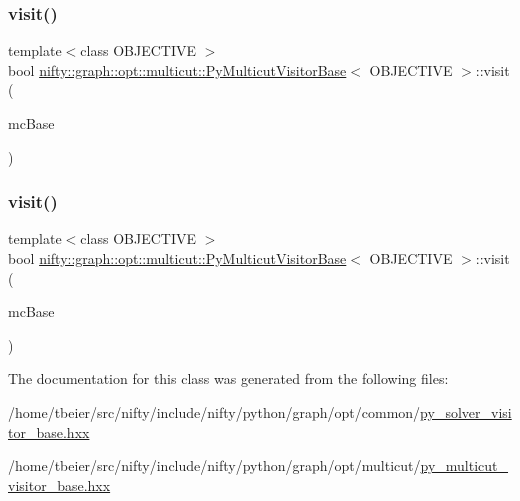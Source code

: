\subsubsection{\texorpdfstring{visit()}{visit()}\hspace{0.1cm}{\footnotesize\ttfamily [1/2]}}
{\footnotesize\ttfamily template$<$class O\+B\+J\+E\+C\+T\+I\+VE $>$ \\
bool \hyperlink{classnifty_1_1graph_1_1opt_1_1multicut_1_1PyMulticutVisitorBase}{nifty\+::graph\+::opt\+::multicut\+::\+Py\+Multicut\+Visitor\+Base}$<$ O\+B\+J\+E\+C\+T\+I\+VE $>$\+::visit (\begin{DoxyParamCaption}\item[{\hyperlink{classnifty_1_1graph_1_1opt_1_1multicut_1_1PyMulticutVisitorBase_aa6d9f36fb629bf51dadbc1018595cb14}{Mc\+Base} $\ast$}]{mc\+Base }\end{DoxyParamCaption})\hspace{0.3cm}{\ttfamily [inline]}}

\mbox{\label{classnifty_1_1graph_1_1opt_1_1multicut_1_1PyMulticutVisitorBase_a8cf6b53826b99b40dd5bf2734e04ea57}} 
\subsubsection{\texorpdfstring{visit()}{visit()}\hspace{0.1cm}{\footnotesize\ttfamily [2/2]}}
{\footnotesize\ttfamily template$<$class O\+B\+J\+E\+C\+T\+I\+VE $>$ \\
bool \hyperlink{classnifty_1_1graph_1_1opt_1_1multicut_1_1PyMulticutVisitorBase}{nifty\+::graph\+::opt\+::multicut\+::\+Py\+Multicut\+Visitor\+Base}$<$ O\+B\+J\+E\+C\+T\+I\+VE $>$\+::visit (\begin{DoxyParamCaption}\item[{\hyperlink{classnifty_1_1graph_1_1opt_1_1multicut_1_1PyMulticutVisitorBase_aa6d9f36fb629bf51dadbc1018595cb14}{Mc\+Base} $\ast$}]{mc\+Base }\end{DoxyParamCaption})\hspace{0.3cm}{\ttfamily [inline]}}



The documentation for this class was generated from the following files\+:\begin{DoxyCompactItemize}
\item 
/home/tbeier/src/nifty/include/nifty/python/graph/opt/common/\hyperlink{py__solver__visitor__base_8hxx}{py\+\_\+solver\+\_\+visitor\+\_\+base.\+hxx}\item 
/home/tbeier/src/nifty/include/nifty/python/graph/opt/multicut/\hyperlink{py__multicut__visitor__base_8hxx}{py\+\_\+multicut\+\_\+visitor\+\_\+base.\+hxx}\end{DoxyCompactItemize}
